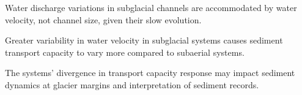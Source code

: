\documentclass[draft]{agujournal2019}
\begin{document}





\begin{keypoints}
\item Water discharge variations in subglacial channels are accommodated by water velocity, not channel size, given their slow evolution.

\item  Greater variability in water velocity in subglacial systems causes sediment transport capacity to vary more compared to subaerial systems.


\item The systems' divergence in transport capacity response may impact sediment dynamics at glacier margins and interpretation of sediment records.
\end{keypoints}


% 
% 

% 
% 
\end{document}
